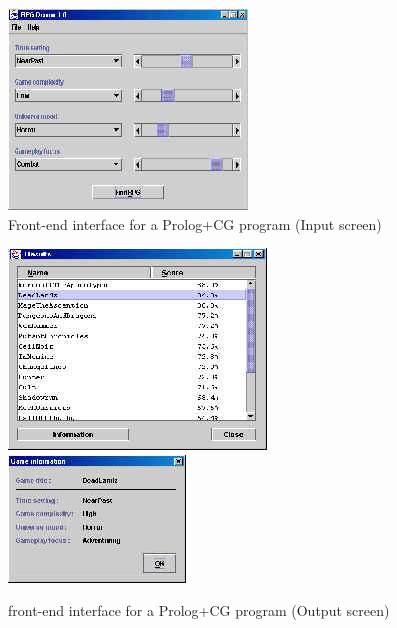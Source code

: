 \documentclass{book}
\begin{document}
\begin{htmlonly}

\begin{figure}
\begin{center}
\includegraphics{Prolog1.jpg}
\end{center}
\caption{\label{Fig:InputScreen}Front-end interface for a Prolog+CG
program (Input screen)}
\end{figure}

\end{htmlonly}


\begin{latexonly}

\begin{figure}
\begin{center}
\includegraphics[scale=0.2]{Prolog2.jpg}\includegraphics[scale=0.2]{Prolog3.jpg}
\end{center}
\caption{\label{Fig:OutputScreen}front-end interface for a Prolog+CG
program (Output screen)}
\end{figure}

\end{latexonly}
\end{document}
